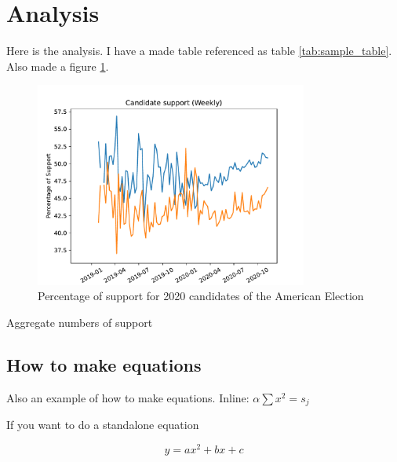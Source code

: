 \section{Analysis}

Here is the analysis. I have a made table referenced as table \ref{tab:sample_table}. Also made a figure \ref{fig:sample_figure}.

\begin{figure}[ht]
    \centering
    \includegraphics[width=0.8\textwidth]{../output/figures/weekly_candidate_support.pdf}
    \caption{Percentage of support for 2020 candidates of the American Election}
    \label{fig:sample_figure}
\end{figure}

\begin{table}[ht]
    \centering
    
    \caption{Aggregate numbers of support}
    \label{tab:sample_table}
\end{table}

\subsection{How to make equations}

Also an example of how to make equations. Inline: $\alpha \sum x^2 = s_j$

If you want to do a standalone equation

\begin{equation}
    y = a x^2 + b x + c
\end{equation}